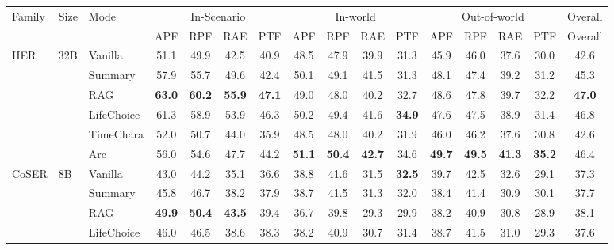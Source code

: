 \documentclass{llmxive}
\providecommand{\arraystretch}{0.95}
\begin{document}
\begin{table}[!htbp]
\centering
\scriptsize
\setlength{\tabcolsep}{5pt}
\renewcommand{\arraystretch}{0.85}
\setlength{\aboverulesep}{0.2ex}
\setlength{\belowrulesep}{0.2ex}
\begin{tabular}{lllccccccccccccc}
\toprule
Family & Size & Mode & \multicolumn{4}{c}{In-Scenario} & \multicolumn{4}{c}{In-world} & \multicolumn{4}{c}{Out-of-world} & Overall \\
\cmidrule(lr){4-7} \cmidrule(lr){8-11} \cmidrule(lr){12-15} \cmidrule(lr){16-16}
 & & & APF & RPF & RAE & PTF & APF & RPF & RAE & PTF & APF & RPF & RAE & PTF & Overall \\
\midrule
\multirow[t]{6}{*}{HER} & \multirow[t]{6}{*}{32B} & Vanilla & 51.1 & 49.9 & 42.5 & 40.9 & 48.5 & 47.9 & 39.9 & 31.3 & 45.9 & 46.0 & 37.6 & 30.0 & 42.6 \\
 &  & Summary & 57.9 & 55.7 & 49.6 & 42.4 & 50.1 & 49.1 & 41.5 & 31.3 & 48.1 & 47.4 & 39.2 & 31.2 & 45.3 \\
 &  & RAG & \textbf{63.0} & \textbf{60.2} & \textbf{55.9} & \textbf{47.1} & 49.0 & 48.0 & 40.2 & 32.7 & 48.6 & 47.8 & 39.7 & 32.2 & \textbf{47.0} \\
 &  & LifeChoice & 61.3 & 58.9 & 53.9 & 46.3 & 50.2 & 49.4 & 41.6 & \textbf{34.9} & 47.6 & 47.5 & 38.9 & 31.4 & 46.8 \\
 &  & TimeChara & 52.0 & 50.7 & 44.0 & 35.9 & 48.5 & 48.0 & 40.2 & 31.9 & 46.0 & 46.2 & 37.6 & 30.8 & 42.6 \\
 &  & \cellcolor{yellow!15} Arc & \cellcolor{yellow!15} 56.0 & \cellcolor{yellow!15} 54.6 & \cellcolor{yellow!15} 47.7 & \cellcolor{yellow!15} 44.2 & \cellcolor{yellow!15} \textbf{51.1} & \cellcolor{yellow!15} \textbf{50.4} & \cellcolor{yellow!15} \textbf{42.7} & \cellcolor{yellow!15} 34.6 & \cellcolor{yellow!15} \textbf{49.7} & \cellcolor{yellow!15} \textbf{49.5} & \cellcolor{yellow!15} \textbf{41.3} & \cellcolor{yellow!15} \textbf{35.2} & \cellcolor{yellow!15} 46.4 \\
\midrule
\multirow[t]{12}{*}{CoSER} & \multirow[t]{6}{*}{8B} & Vanilla & 43.0 & 44.2 & 35.1 & 36.6 & 38.8 & 41.6 & 31.5 & \textbf{32.5} & 39.7 & 42.5 & 32.6 & 29.1 & 37.3 \\
 &  & Summary & 45.8 & 46.7 & 38.2 & 37.9 & 38.7 & 41.5 & 31.3 & 32.0 & 38.4 & 41.4 & 30.9 & 30.1 & 37.7 \\
 &  & RAG & \textbf{49.9} & \textbf{50.4} & \textbf{43.5} & 39.4 & 36.7 & 39.8 & 29.3 & 29.9 & 38.2 & 40.9 & 30.8 & 28.9 & 38.1 \\
 &  & LifeChoice & 46.0 & 46.5 & 38.6 & 38.3 & 38.2 & 40.9 & 30.7 & 31.4 & 38.7 & 41.5 & 31.0 & 29.3 & 37.6 \\

\end{tabular}
\end{table}
\end{document}
